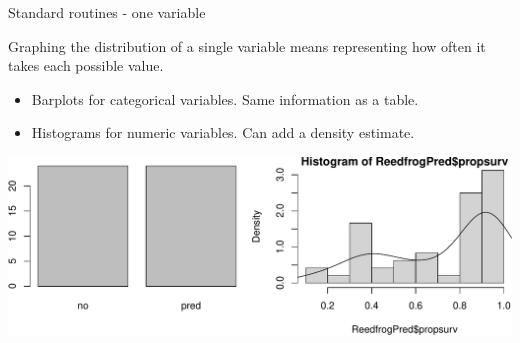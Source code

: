 \documentclass[
  ignorenonframetext,
]{beamer}
\newenvironment{Shaded}{\begin{snugshade}}{\end{snugshade}}
\newcommand{\CommentTok}[1]{\textcolor[rgb]{0.56,0.35,0.01}{\textit{#1}}}
\newcommand{\DataTypeTok}[1]{\textcolor[rgb]{0.13,0.29,0.53}{#1}}
\newcommand{\DecValTok}[1]{\textcolor[rgb]{0.00,0.00,0.81}{#1}}
\newcommand{\KeywordTok}[1]{\textcolor[rgb]{0.13,0.29,0.53}{\textbf{#1}}}
\newcommand{\NormalTok}[1]{#1}
\newcommand{\OperatorTok}[1]{\textcolor[rgb]{0.81,0.36,0.00}{\textbf{#1}}}
\providecommand{\tightlist}{%
  \setlength{\itemsep}{0pt}\setlength{\parskip}{0pt}}
\begin{document}
\begin{frame}[fragile]{Standard routines - one variable}
\protect\hypertarget{standard-routines---one-variable}{}

Graphing the distribution of a single variable means representing how
often it takes each possible value.

\begin{itemize}
\tightlist
\item
  Barplots for categorical variables. Same information as a table.
\item
  Histograms for numeric variables. Can add a density estimate.
\end{itemize}

\scriptsize

\begin{Shaded}
\end{Shaded}

\includegraphics{data_viz_files/figure-beamer/unnamed-chunk-4-1.pdf}

\end{frame}
\end{document}
